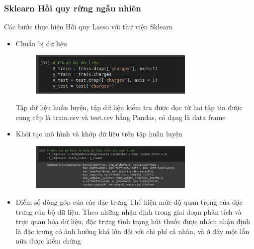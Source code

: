 \documentclass{article}
\begin{document}
	\subsubsection{Sklearn Hồi quy rừng ngẫu nhiên}
	Các bước thực hiện Hồi quy Lasso với thư viện Sklearn
	\begin{itemize}
		\item Chuẩn bị dữ liệu
		\begin{figure}[H]
			\centering
			\includegraphics[width=0.75\textwidth]{images/random_forest_reg/random_forest_data_preparation.png}
		\end{figure}
		Tập dữ liệu huấn luyện, tập dữ liệu kiểm tra được đọc từ hai tập tin được cung cấp là train.csv và test.csv bằng Pandas, có dạng là data frame
		\item Khởi tạo mô hình và khớp dữ liệu trên tập huấn luyện
		\begin{figure}[H]
			\centering
			\includegraphics[width=0.75\textwidth]{images/random_forest_reg/random_forest_init_fit.png}
		\end{figure}
		\item Điểm số đóng góp của các đặc trưng
		Thể hiện mức độ quan trọng của đặc trưng của bộ dữ liệu. Theo những nhận định trong giai đoạn phân tích và trực quan hóa dữ liệu, đặc trưng tình trạng hút thuốc được nhóm nhận định là đặc trưng có ảnh hưởng khá lớn đối với chi phí cá nhân, và ở đây một lần nữa được kiểm chứng
		

\end{itemize}
\end{document}
